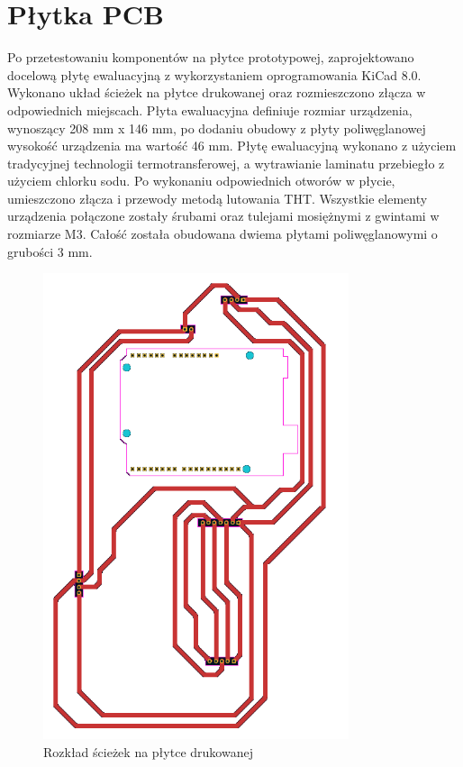 \vspace{12pt}

\section*{Płytka PCB}

Po przetestowaniu komponentów na płytce prototypowej, zaprojektowano docelową płytę ewaluacyjną z wykorzystaniem oprogramowania KiCad 8.0. Wykonano układ ścieżek na płytce drukowanej oraz rozmieszczono złącza w odpowiednich miejscach. Płyta ewaluacyjna definiuje rozmiar urządzenia, wynoszący 208 mm x 146 mm,
po dodaniu obudowy z płyty poliwęglanowej wysokość urządzenia ma wartość 46 mm.
Płytę ewaluacyjną wykonano z użyciem tradycyjnej technologii termotransferowej, a wytrawianie laminatu przebiegło z użyciem chlorku sodu. Po wykonaniu odpowiednich otworów w płycie, umieszczono złącza i przewody metodą lutowania THT. Wszystkie elementy urządzenia połączone zostały śrubami oraz tulejami mosiężnymi z gwintami w rozmiarze M3. Całość została obudowana dwiema płytami poliwęglanowymi o grubości 3 mm.

\begin{figure}[h!]
    \centering
    \includegraphics[width=0.8\textwidth]{images/layout.png}
    \caption{Rozkład ścieżek na płytce drukowanej}
    \label{fig:pcb}
\end{figure}

